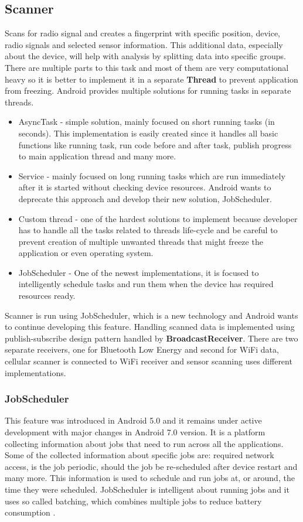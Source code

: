 \subsection{Scanner}\label{subsec:Scanner}
Scans for radio signal and creates a fingerprint with specific position, device, radio signals and selected sensor information. This additional data, especially about the device, will help with analysis by splitting data into specific groups. There are multiple parts to this task and most of them are very computational heavy so it is better to implement it in a separate \textbf{Thread} to prevent application from freezing. Android provides multiple solutions for running tasks in separate threads.

\begin{itemize}
	\item AsyncTask - simple solution, mainly focused on short running tasks (in seconds). This implementation is easily created since it handles all basic functions like running task, run code before and after task, publish progress to main application thread and many more.
	\item Service - mainly focused on long running tasks which are run immediately after it is started without checking device resources. Android wants to deprecate this approach and develop their new solution, JobScheduler.
	\item Custom thread - one of the hardest solutions to implement because developer has to handle all the tasks related to threads life-cycle and be careful to prevent creation of multiple unwanted threads that might freeze the application or even operating system.
	\item JobScheduler - One of the newest implementations, it is focused to intelligently schedule tasks and run them when the device has required resources ready.
\end{itemize}

Scanner is run using JobScheduler, which is a new technology and Android wants to continue developing this feature. Handling scanned data is implemented using publish-subscribe design pattern handled by \textbf{BroadcastReceiver}. There are two separate receivers, one for Bluetooth Low Energy and second for WiFi data, cellular scanner is connected to WiFi receiver and sensor scanning uses different implementations.

\subsubsection{JobScheduler}\label{subsubsec:JobScheduler}
This feature was introduced in Android 5.0 and it remains under active development with major changes in Android 7.0 version. It is a platform collecting information about jobs that need to run across all the applications. Some of the collected information about specific jobs are: required network access, is the job periodic, should the job be re-scheduled after device restart and many more. This information is used to schedule and run jobs at, or around, the time they were scheduled. JobScheduler is intelligent about running jobs and it uses so called batching, which combines multiple jobs to reduce battery consumption \cite{AD, SOTAJS}.

